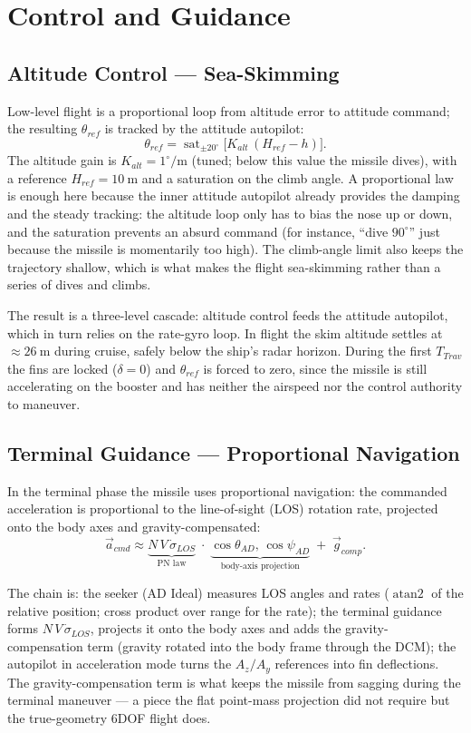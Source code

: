 \section{Control and Guidance}

\subsection{Altitude Control --- Sea-Skimming}

Low-level flight is a proportional loop from altitude error to attitude command; the resulting $\theta_{ref}$ is tracked by the attitude autopilot:
\[
    \theta_{ref}=\operatorname{sat}_{\pm 20^\circ}\!\big[K_{alt}\,(H_{ref}-h)\big].
\]
The altitude gain is $K_{alt}=1^\circ/\text{m}$ (tuned; below this value the missile dives), with a reference $H_{ref}=10~\text{m}$ and a saturation on the climb angle. A proportional law is enough here because the inner attitude autopilot already provides the damping and the steady tracking: the altitude loop only has to bias the nose up or down, and the saturation prevents an absurd command (for instance, ``dive $90^\circ$'' just because the missile is momentarily too high). The climb-angle limit also keeps the trajectory shallow, which is what makes the flight sea-skimming rather than a series of dives and climbs.

The result is a three-level cascade: altitude control feeds the attitude autopilot, which in turn relies on the rate-gyro loop. In flight the skim altitude settles at $\approx 26~\text{m}$ during cruise, safely below the ship's radar horizon. During the first $T_{Trav}$ the fins are locked ($\delta=0$) and $\theta_{ref}$ is forced to zero, since the missile is still accelerating on the booster and has neither the airspeed nor the control authority to maneuver.

\subsection{Terminal Guidance --- Proportional Navigation}

In the terminal phase the missile uses proportional navigation: the commanded acceleration is proportional to the line-of-sight (LOS) rotation rate, projected onto the body axes and gravity-compensated:
\[
    \vec a_{cmd}\approx
    \underbrace{N\,V\,\dot\sigma_{LOS}}_{\text{PN law}}\;\cdot\;
    \underbrace{\cos\theta_{AD},\,\cos\psi_{AD}}_{\text{body-axis projection}}\;+\;
    \vec g_{comp}.
\]

The chain is: the seeker (AD Ideal) measures LOS angles and rates ($\operatorname{atan2}$ of the relative position; cross product over range for the rate); the terminal guidance forms $N\,V\,\dot\sigma_{LOS}$, projects it onto the body axes and adds the gravity-compensation term (gravity rotated into the body frame through the DCM); the autopilot in acceleration mode turns the $A_z/A_y$ references into fin deflections. The gravity-compensation term is what keeps the missile from sagging during the terminal maneuver --- a piece the flat point-mass projection did not require but the true-geometry 6DOF flight does.


